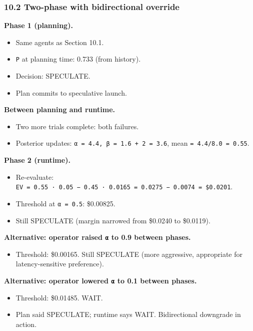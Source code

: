 \documentclass[
  11pt,
]{article}
\providecommand{\tightlist}{%
  \setlength{\itemsep}{0pt}\setlength{\parskip}{0pt}}
\begin{document}
\subsubsection{10.2 Two-phase with bidirectional
override}\label{two-phase-with-bidirectional-override}

\textbf{Phase 1 (planning).}

\begin{itemize}
\tightlist
\item
  Same agents as Section 10.1.
\item
  \texttt{P} at planning time: 0.733 (from history).
\item
  Decision: SPECULATE.
\item
  Plan commits to speculative launch.
\end{itemize}

\textbf{Between planning and runtime.}

\begin{itemize}
\tightlist
\item
  Two more trials complete: both failures.
\item
  Posterior updates: \texttt{α\ =\ 4.4,\ β\ =\ 1.6\ +\ 2\ =\ 3.6}, mean
  \texttt{=\ 4.4/8.0\ =\ 0.55}.
\end{itemize}

\textbf{Phase 2 (runtime).}

\begin{itemize}
\tightlist
\item
  Re-evaluate:
  \texttt{EV\ =\ 0.55\ ·\ 0.05\ −\ 0.45\ ·\ 0.0165\ =\ 0.0275\ −\ 0.0074\ =\ \$0.0201}.
\item
  Threshold at \texttt{α\ =\ 0.5}: \$0.00825.
\item
  Still SPECULATE (margin narrowed from \$0.0240 to \$0.0119).
\end{itemize}

\textbf{Alternative: operator raised \texttt{α} to 0.9 between phases.}

\begin{itemize}
\tightlist
\item
  Threshold: \$0.00165. Still SPECULATE (more aggressive, appropriate
  for latency-sensitive preference).
\end{itemize}

\textbf{Alternative: operator lowered \texttt{α} to 0.1 between phases.}

\begin{itemize}
\tightlist
\item
  Threshold: \$0.01485. WAIT.
\item
  Plan said SPECULATE; runtime says WAIT. Bidirectional downgrade in
  action.
\end{itemize}
\end{document}

